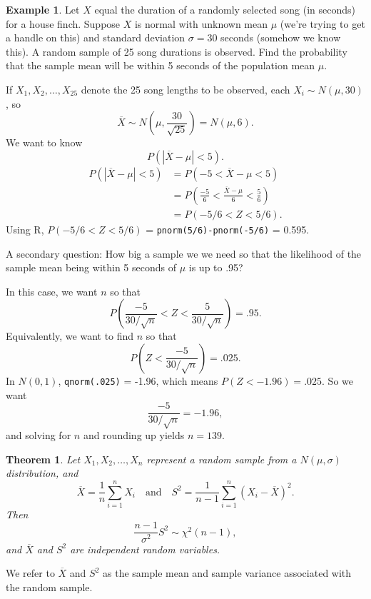 \documentclass[
]{book}
\newtheorem{theorem}{Theorem}[chapter]
\theoremstyle{definition}
\theoremstyle{definition}
\newtheorem{example}{Example}[chapter]
\theoremstyle{definition}
\theoremstyle{definition}
\theoremstyle{remark}
\begin{document}
\begin{example}
\protect\hypertarget{exm:house-finch}{}\label{exm:house-finch}Let \(X\) equal the duration of a randomly selected song (in seconds) for a house finch. Suppose \(X\) is normal with unknown mean \(\mu\) (we're trying to get a handle on this) and standard deviation \(\sigma = 30\) seconds (somehow we know this). A random sample of 25 song durations is observed. Find the probability that the sample mean will be within 5 seconds of the population mean \(\mu\).

If \(X_1, X_2, \ldots, X_{25}\) denote the 25 song lengths to be observed, each \(X_i \sim N(\mu,30)\), so \[\overline{X} \sim N\left(\mu,\frac{30}{\sqrt{25}}\right) = N(\mu,6).\]
We want to know \[P(|\overline{X}-\mu| < 5).\]
\begin{align*}
P(|\overline{X}-\mu| < 5) &= P(-5 < \overline{X}-\mu < 5)\\
                          &= P\left(\frac{-5}{6} < \frac{\overline{X}-\mu}{6} < \frac{5}{6}\right)\\
                          &= P(-5/6 < Z < 5/6).
\end{align*}
Using R, \(P(-5/6 < Z < 5/6)\) = \texttt{pnorm(5/6)-pnorm(-5/6)} = 0.595.

A secondary question: How big a sample we we need so that the likelihood of the sample mean being within 5 seconds of \(\mu\) is up to .95?

In this case, we want \(n\) so that
\[P\left(\frac{-5}{30/\sqrt{n}} < Z < \frac{5}{30/\sqrt{n}}\right) = .95.\]
Equivalently, we want to find \(n\) so that \[P\left(Z < \frac{-5}{30/\sqrt{n}}\right) = .025.\]
In \(N(0,1)\), \texttt{qnorm(.025)} = -1.96, which means \(P(Z < -1.96) = .025\).
So we want \[\frac{-5}{30/\sqrt{n}} = -1.96,\] and solving for \(n\) and rounding up yields \(n = 139\).
\end{example}

\begin{theorem}
\protect\hypertarget{thm:sample-variance-chisq}{}\label{thm:sample-variance-chisq}Let \(X_1, X_2, \ldots, X_n\) represent a random sample from a \(N(\mu,\sigma)\) distribution, and \[\overline{X} = \frac{1}{n} \sum_{i=1}^n X_i ~~~ \text { and } ~~~ S^2 = \frac{1}{n-1}\sum_{i=1}^n (X_i - \overline{X})^2.\] Then \[\frac{n-1}{\sigma^2}S^2 \sim \chi^2(n-1),\] and \(\overline{X}\) and \(S^2\) are independent random variables.
\end{theorem}

We refer to \(\overline{X}\) and \(S^2\) as the sample mean and sample variance associated with the random sample.
\end{document}
